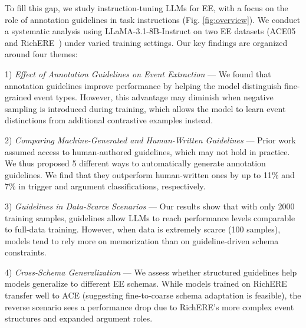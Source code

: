 
To fill this gap, we study instruction-tuning LLMs for EE, with a focus on the role of annotation guidelines in task instructions (Fig. \ref{fig:overview}). 
We conduct a systematic analysis using LLaMA-3.1-8B-Instruct on two EE datasets (ACE05~\cite{doddington-etal-2004-automatic} and RichERE~\cite{song-etal-2015-light}) under varied training settings. Our key findings are organized around four themes:

1) \textit{Effect of Annotation Guidelines on Event Extraction} — We found that annotation guidelines improve performance by helping the model distinguish fine-grained event types. However, this advantage may diminish when negative sampling is introduced during training, which allows the model to learn event distinctions from additional contrastive examples instead.

2) \textit{Comparing Machine-Generated and Human-Written Guidelines} — Prior work assumed access to human-authored guidelines, which may not hold in practice. We thus proposed 5 different ways to automatically generate annotation guidelines. We find that they outperform human-written ones by up to 11\% and 7\% in trigger and argument classifications, respectively. 

3) \textit{Guidelines in Data-Scarce Scenarios} — Our results show that with only 2000 training samples, guidelines allow LLMs to reach performance levels comparable to full-data training. However, when data is extremely scarce (100 samples), models tend to rely more on memorization than on guideline-driven schema constraints.

4) \textit{Cross-Schema Generalization} — We assess whether structured guidelines help models generalize to different EE schemas. While models trained on RichERE transfer well to ACE (suggesting fine-to-coarse schema adaptation is feasible), the reverse scenario sees a performance drop due to RichERE’s more complex event structures and expanded argument roles.

